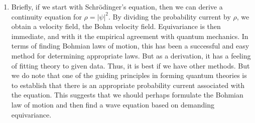 \documentclass[11pt]{article}
\theoremstyle{remark}
\begin{document}
\begin{enumerate}
What about Schr\"odinger's equation? Well, classically, 
the energy of a particle is 
\[
E = \frac{\ensuremath{\boldsymbol{p}} \cdot \ensuremath{\boldsymbol{p}}}{2m} + V \label{bie:en} .
\]
We look for the simplest wave equation whose plane wave solutions
\eqref{bie:gp} are consistent with \eqref{bie:pk}, \eqref{bie:ew}, and
\eqref{bie:en}. 
We find that \eqref{bie:ew} implies for plane waves, that  
\[E = -\frac{\hbar}{i\ensuremath{\psi}} 
\ensuremath{\frac{\partial {\ensuremath{\psi}}}{\partial {t}}}.\] 
As for the $\ensuremath{\boldsymbol{p}}$ term, we have two possibilities:
\begin{align} 
\ensuremath{\boldsymbol{p}}
\cdot  \ensuremath{\boldsymbol{p}} =&  - \hbar^2
\frac{\nabla \ensuremath{\psi}}{\ensuremath{\psi}} \cdot \frac{\nabla \ensuremath{\psi}}{\ensuremath{\psi}}  \label{bie:p2a}
\end{align}
or 
\begin{align}
\label{bie:p2b}
 \ensuremath{\boldsymbol{p}}
\cdot  \ensuremath{\boldsymbol{p}} =&
-\hbar^2 \frac{\ensuremath{\Delta} \ensuremath{\psi}}{\ensuremath{\psi}}.
\end{align}
Choosing \eqref{bie:p2b}
 leads to  
\[
-\frac{\hbar}{i\ensuremath{\psi}} 
\ensuremath{\frac{\partial {\ensuremath{\psi}}}{\partial {t}}} = -\frac{\hbar^2}{2m} \frac{\ensuremath{\Delta} \ensuremath{\psi}}{\ensuremath{\psi}} +V,
\]
which becomes Schr\"odinger's wave equation after multiplying through by $\ensuremath{\psi}$.
As for \eqref{bie:p2a}, this is not a linear equation. For a linear
equation, knowing the solutions for any initial plane wave actually
 specifies the
evolution for any function. This is not true for nonlinear equations. 

We have arrived at Bohmian mechanics. We shall discuss in the companion manuscript on geometrically formulating Bohmian theories how to arrive at the Pauli equation. 

\item Briefly, if we start with Schr\"odinger's equation, then we can derive a
continuity equation for $\ensuremath{\rho} = \ensuremath{|\ensuremath{\psi}|^2}$. By dividing the probability
current by $\ensuremath{\rho}$, we obtain a velocity field, 
the Bohm velocity field. Equivariance is then immediate, and with it
the 
empirical agreement with quantum mechanics. In terms of
finding Bohmian laws of motion, this has been a successful and easy
method for determining appropriate laws.
 But as a derivation, it has a
feeling of fitting theory to given data. Thus, it is best if we have
other methods. But we do note that 
 one of the guiding principles in forming quantum
theories is to establish that there is an appropriate 
probability current associated with the equation. This suggests that
we should perhaps formulate the Bohmian law of motion and then find a
wave equation based on demanding equivariance.


\end{enumerate}
\end{document}
